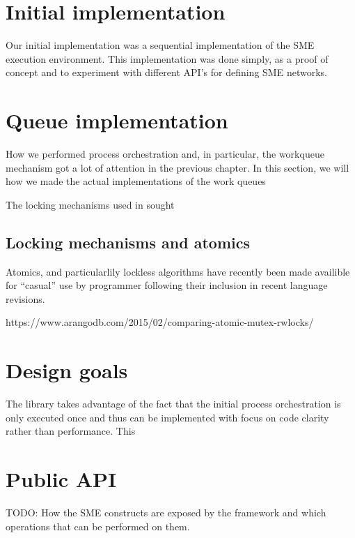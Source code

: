 \section{Initial implementation}
Our initial implementation was a sequential implementation of the
SME execution environment. This implementation was done simply, as a
proof of concept and to experiment with different API's for defining
SME networks.

\section{Queue implementation}
How we performed process orchestration and, in particular, the
workqueue mechanism got a lot of attention in the previous chapter. In
this section, we will how we made the actual implementations of the
work queues

The locking mechanisms used in sought 

\subsection{Locking mechanisms and atomics}
Atomics, and particularlily lockless algorithms have recently been
made availible for ``casual'' use by programmer following their
inclusion in recent language revisions.

https://www.arangodb.com/2015/02/comparing-atomic-mutex-rwlocks/

\section{Design goals}
The library takes advantage of the fact that the initial process
orchestration is only executed once and thus can be implemented with
focus on code clarity rather than performance. This 

\section{Public API}
TODO: How the SME constructs are exposed by the framework and which
operations that can be performed on them.




